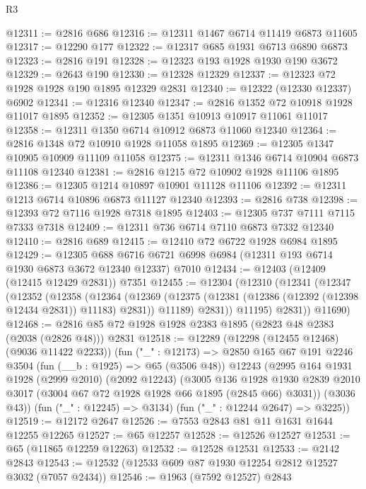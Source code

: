 \begin{lexlean}{R3}
\begin{coremodule}
@12311 := @2816 @686
@12316 := @12311 @1467 @6714 @11419 @6873 @11605
@12317 := @12290 @177
@12322 := @12317 @685 @1931 @6713 @6890 @6873
@12323 := @2816 @191
@12328 := @12323 @193 @1928 @1930 @190 @3672
@12329 := @2643 @190
@12330 := @12328 @12329
@12337 := @12323 @72 @1928 @1928 @190 @1895 @12329 @2831
@12340 := @12322 (@12330 @12337) @6902
@12341 := @12316 @12340
@12347 := @2816 @1352 @72 @10918 @1928 @11017 @1895
@12352 := @12305 @1351 @10913 @10917 @11061 @11017
@12358 := @12311 @1350 @6714 @10912 @6873 @11060 @12340
@12364 := @2816 @1348 @72 @10910 @1928 @11058 @1895
@12369 := @12305 @1347 @10905 @10909 @11109 @11058
@12375 := @12311 @1346 @6714 @10904 @6873 @11108 @12340
@12381 := @2816 @1215 @72 @10902 @1928 @11106 @1895
@12386 := @12305 @1214 @10897 @10901 @11128 @11106
@12392 := @12311 @1213 @6714 @10896 @6873 @11127 @12340
@12393 := @2816 @738
@12398 := @12393 @72 @7116 @1928 @7318 @1895
@12403 := @12305 @737 @7111 @7115 @7333 @7318
@12409 := @12311 @736 @6714 @7110 @6873 @7332 @12340
@12410 := @2816 @689
@12415 := @12410 @72 @6722 @1928 @6984 @1895
@12429 := @12305
    @688
    @6716
    @6721
    @6998
    @6984
    (@12311 @193 @6714 @1930 @6873 @3672 @12340 @12337)
    @7010
@12434 := @12403 (@12409 (@12415 @12429 @2831)) @7351
@12455 := @12304
    (@12310
      (@12341
        (@12347
          (@12352
            (@12358
              (@12364
                (@12369
                  (@12375 (@12381 (@12386 (@12392 (@12398 @12434 @2831)) @11183) @2831))
                  @11189)
                @2831))
            @11195)
          @2831))
      @11690)
@12468 := @2816 @85 @72 @1928 @1928 @2383 @1895 (@2823 @48 @2383 (@2038 (@2826 @48))) @2831
@12518 := @12289
    (@12298 (@12455 @12468) (@9036 @11422 @2233))
    (fun ("_" : @12173) =>
    @2850
      @165
      @67
      @191
      @2246
      @3504
      (fun (__b : @1925) => @65 (@3506 @48))
      @12243
      (@2995
        @164
        @1931
        @1928
        (@2999 @2010)
        (@2092 @12243)
        (@3005
          @136
          @1928
          @1930
          @2839
          @2010
          @3017
          (@3004 @67 @72 @1928 @1928 @66 @1895 (@2845 @66) @3031))
        (@3036 @43))
      (fun ("_" : @12245) => @3134)
      (fun ("_" : @12244 @2647) => @3225))
@12519 := @12172 @2647
@12526 := @7553 @2843 @81 @11 @1631 @1644 @12255 @12265
@12527 := @65 @12257
@12528 := @12526 @12527
@12531 := @65 (@11865 @12259 @12263)
@12532 := @12528 @12531
@12533 := @2142 @2843
@12543 := @12532 (@12533 @609 @87 @1930 @12254 @2812 @12527 @3032 (@7057 @2434))
@12546 := @1963 (@7592 @12527) @2843

\end{coremodule}
\end{lexlean}
